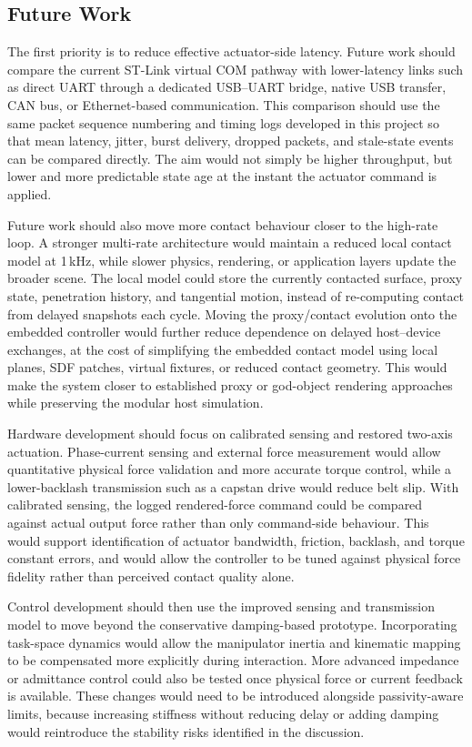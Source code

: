 \subsection{Future Work} \label{sec:future_work}

The first priority is to reduce effective actuator-side latency. Future work should compare the current ST-Link virtual COM pathway with lower-latency links such as direct UART through a dedicated USB--UART bridge, native USB transfer, CAN bus, or Ethernet-based communication. This comparison should use the same packet sequence numbering and timing logs developed in this project so that mean latency, jitter, burst delivery, dropped packets, and stale-state events can be compared directly. The aim would not simply be higher throughput, but lower and more predictable state age at the instant the actuator command is applied.

Future work should also move more contact behaviour closer to the high-rate loop. A stronger multi-rate architecture would maintain a reduced local contact model at 1\,kHz, while slower physics, rendering, or application layers update the broader scene. The local model could store the currently contacted surface, proxy state, penetration history, and tangential motion, instead of re-computing contact from delayed snapshots each cycle. Moving the proxy/contact evolution onto the embedded controller would further reduce dependence on delayed host--device exchanges, at the cost of simplifying the embedded contact model using local planes, SDF patches, virtual fixtures, or reduced contact geometry. This would make the system closer to established proxy or god-object rendering approaches while preserving the modular host simulation.

Hardware development should focus on calibrated sensing and restored two-axis actuation. Phase-current sensing and external force measurement would allow quantitative physical force validation and more accurate torque control, while a lower-backlash transmission such as a capstan drive would reduce belt slip. With calibrated sensing, the logged rendered-force command could be compared against actual output force rather than only command-side behaviour. This would support identification of actuator bandwidth, friction, backlash, and torque constant errors, and would allow the controller to be tuned against physical force fidelity rather than perceived contact quality alone.

Control development should then use the improved sensing and transmission model to move beyond the conservative damping-based prototype. Incorporating task-space dynamics would allow the manipulator inertia and kinematic mapping to be compensated more explicitly during interaction. More advanced impedance or admittance control could also be tested once physical force or current feedback is available. These changes would need to be introduced alongside passivity-aware limits, because increasing stiffness without reducing delay or adding damping would reintroduce the stability risks identified in the discussion.

